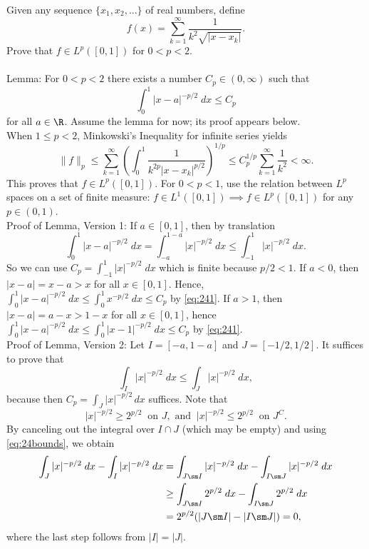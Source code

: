 \begin{hwsol}
Given any sequence $\{ x_1, x_2,\ldots \}$ of real numbers, define 
        \[
        f(x)= \sum_{k=1}^\infty \dfrac{1}{k^2 \sqrt{|x-x_k|}}.
        \]
Prove that $f \in L^p([0, 1])$ for $0< p < 2$. \\ 

\pf \hfill \\
\noindent Lemma: For $0< p < 2$ there exists a number $C_p \in (0, \infty)$ such that 
        \[
        \int_0^1 |x-a|^{-p/2} \;dx \leq C_p
        \]
for all $a \in \R$. Assume the lemma for now; its proof appears below. \\

When $1 \leq p < 2$, Minkowski's Inequality for infinite series yields
        \[
        \|f\|_p \leq \sum_{k=1}^\infty \left(\int_0^1 \frac{1}{k^{2p} |x-x_k|^{p/2}} \right)^{1/p} \leq C_p^{1/p} \sum_{k=1}^\infty \frac{1}{k^2} < \infty.
        \]
This proves that $f \in L^p([0, 1])$. For $0< p < 1$, use the relation between $L^p$ spaces on a set of finite measure: $f \in L^1([0, 1])\implies f \in L^p([0, 1])$ for any $p \in (0,1)$. \\

\noindent Proof of Lemma, Version 1: If $a\in [0, 1]$, then by translation
        \begin{equation} \label{eq:241}
        \int_0^1 |x-a|^{-p/2} \;dx= \int_{-a}^{1-a} |x|^{-p/2} \;dx \leq \int_{-1}^{1} |x|^{-p/2} \;dx.
        \end{equation}
So we can use $C_p= \int_{-1}^{1} |x|^{-p/2} \;dx$ which is finite because $p/2 < 1$. If $a < 0$, then $|x - a|= x - a > x$ for all $x \in [0, 1]$. Hence, $\int_0^1 |x - a|^{-p/2} \;dx \leq \int_0^1 x^{-p/2} \;dx \leq C_p$ by \eqref{eq:241}. If $a > 1$, then $|x - a|= a - x > 1 - x$ for all $x \in [0, 1]$, hence $\int_0^1 |x - a|^{-p/2} \;dx \leq \int_0^1 |x - 1|^{-p/2} \;dx \leq C_p$ by \eqref{eq:241}. \\

\noindent Proof of Lemma, Version 2: Let $I= [-a,1-a]$ and $J= [-1/2,1/2]$. It suffices to prove that 
	\[
	\int_I |x|^{-p/2} \;dx \leq \int_J |x|^{-p/2} \;dx,
	\]
because then $C_p= \int_J |x|^{-p/2}\,dx$ suffices. Note that 
        \begin{equation} \label{eq:24bounds}
        |x|^{-p/2} \geq 2^{p/2} \ \text{  on } J, \text{ and } \ |x|^{-p/2}\leq 2^{p/2} \ \text{ on } J^C.
        \end{equation}
By canceling out the integral over $I \cap J$ (which may be empty) and using \eqref{eq:24bounds}, we obtain  
        \[
        \begin{split}
        \int_J |x|^{-p/2} \;dx - \int_I |x|^{-p/2} \;dx &= \int_{J \sm I} |x|^{-p/2} \;dx - \int_{I \sm J}  |x|^{-p/2} \;dx \\ 
        &\geq \int_{J \sm I} 2^{p/2} \;dx - \int_{I \sm J}  2^{p/2} \;dx \\ 
        &= 2^{p/2} (|J \sm I| - |I \sm J| )= 0,
        \end{split}
        \]
where the last step follows from $|I|=|J|$. \\


\end{hwsol}
